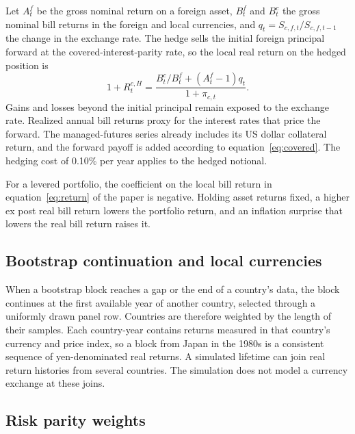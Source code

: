 Let $A^f_t$ be the gross nominal return on a foreign asset, $B^f_t$ and $B^c_t$ the gross nominal bill
returns in the foreign and local currencies, and $q_t=S_{c,f,t}/S_{c,f,t-1}$ the change in the exchange
rate. The hedge sells the initial foreign principal forward at the covered-interest-parity rate, so the
local real return on the hedged position is
\begin{equation}
 1+R^{c,H}_t=\frac{B^c_t/B^f_t+(A^f_t-1)q_t}{1+\pi_{c,t}}.
 \label{eq:covered}
\end{equation}
Gains and losses beyond the initial principal remain exposed to the exchange rate. Realized annual bill
returns proxy for the interest rates that price the forward. The managed-futures series already includes
its US dollar collateral return, and the forward payoff is added according to
equation~\eqref{eq:covered}. The hedging cost of 0.10\% per year applies to the hedged notional.

For a levered portfolio, the coefficient on the local bill return in equation~\eqref{eq:return} of the
paper is negative. Holding asset returns fixed, a higher ex post real bill return lowers the portfolio
return, and an inflation surprise that lowers the real bill return raises it.

\subsection{Bootstrap continuation and local currencies}
\label{app:bootstrap}

When a bootstrap block reaches a gap or the end of a country's data, the block continues at the first
available year of another country, selected through a uniformly drawn panel row. Countries are therefore
weighted by the length of their samples. Each country-year contains returns measured in that country's
currency and price index, so a block from Japan in the 1980s is a consistent sequence of yen-denominated
real returns. A simulated lifetime can join real return histories from several countries. The simulation
does not model a currency exchange at these joins.

\subsection{Risk parity weights}
\label{app:allocation}\label{app:leverage-ladders}

